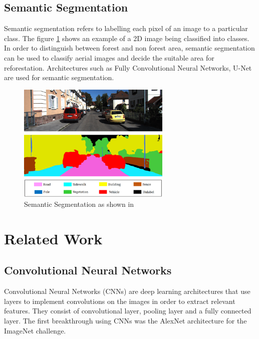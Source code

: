 \documentclass[rnd]{mas_proposal}
\begin{document}



\subsection{Semantic Segmentation}
Semantic segmentation refers to labelling each pixel of an image to a particular class. The figure \ref{fig:semantic_segmentation}  shows an example of a 2D image being classified into classes. In order to distinguish between forest and non forest area, semantic segmentation can be used to classify aerial images and decide the suitable area for reforestation. Architectures such as Fully Convolutional Neural Networks, U-Net are used for semantic segmentation.

\begin{figure}[htp] 
        \centering
        \includegraphics[width=0.65\textwidth]{images/semantic_segmentation.png}
    \caption{Semantic Segmentation as shown in \cite{semantic-segmentation}}%
    \label{fig:semantic_segmentation}%
\end{figure}
\newpage



\section{Related Work}
\subsection{Convolutional Neural Networks}
Convolutional Neural Networks (CNNs) are deep learning architectures that use layers to implement convolutions on the images in order to extract relevant features. They consist of convolutional layer, pooling layer and a fully connected layer. The first breakthrough using CNNs was the AlexNet architecture \cite{alex-net} for the ImageNet challenge. 
\end{document}
